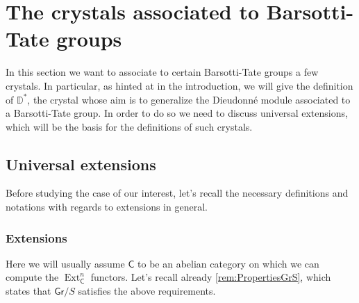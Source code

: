 \section{The crystals associated to Barsotti-Tate groups}
In this section we want to associate to certain Barsotti-Tate groups
a few crystals.
In particular, as hinted at in the introduction, we will give the definition
of $\mathbb{D}^*$, the crystal whose aim is to generalize the Dieudonné module
associated to a Barsotti-Tate group.
In order to do so we need to discuss universal extensions, which will be the basis
for the definitions of such crystals.



\subsection{Universal extensions}
Before studying the case of our interest, let's recall the necessary definitions
and notations with regards to extensions in general.



\subsubsection{Extensions}
Here we will usually assume $\mathsf{C}$ to be an abelian category on which
we can compute the $\operatorname{Ext}^n_{\mathsf{C}}$ functors.
Let's recall already \cref{rem:PropertiesGrS}, which states that $\mathsf{Gr}/S$
satisfies the above requirements.


